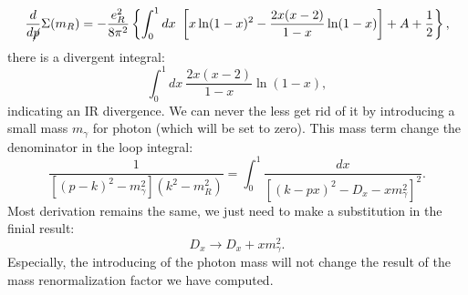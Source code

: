 \documentclass[aps,prb,superscriptaddress,nofootinbib]{revtex4}
\begin{document}
\begin{equation}
	\frac{d}{d \cancel p}\Sigma(m_R)  
	= -\frac{e_R^2}{8\pi^2} \left\{\int_0^1 dx\ \left[ x\ln(1-x)^2 -\frac{2x(x-2)}{1-x}\ln(1-x)\right] + A + \frac{1}{2}\right\},
\end{equation}
there is a divergent integral:
\begin{equation}
	\int_0^1 dx\ \frac{2x(x-2)}{1-x}\ln(1-x),
\end{equation}
indicating an IR divergence.
We can never the less get rid of it by introducing a small mass $m_\gamma$ for photon (which will be set to zero).
This mass term change the denominator in the loop integral:
\begin{equation}
	\frac{1}{\left[(p-k)^2-m_\gamma^2\right](k^2-m_R^2)} 
	= \int_0^1 \frac{dx}{\left[(k-px)^2-D_x -x m_\gamma^2\right]^2}.
\end{equation}
Most derivation remains the same, we just need to make a substitution in the finial result:
\begin{equation}
	D_x \rightarrow D_x + x m_\gamma^2.
\end{equation}
Especially, the introducing of the photon mass will not change the result of the mass renormalization factor we have computed.
\end{document}
